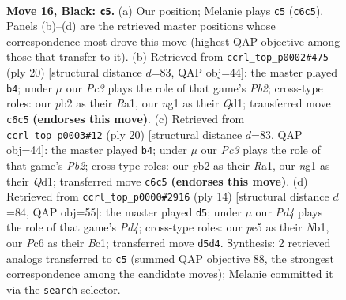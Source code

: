 \documentclass[11pt]{article}
\begin{document}
\clearpage

\begin{figure}[p]\centering
\begin{subfigure}{0.46\textwidth}\centering
\resizebox{\linewidth}{!}{%
\newchessgame
\chessboard[
  setfen={rnb1r3/p2nq1kp/1pp1p1p1/3pP3/8/2N5/PPPQ1PPP/2K1RBNR b - - 3 16},
  showmover=false,
  pgfstyle=straightmove, color=movearrow, markmove={c6-c5}
]}
\caption{}
\end{subfigure}\hfill
\begin{subfigure}{0.46\textwidth}\centering
\resizebox{\linewidth}{!}{%
\newchessgame
\chessboard[
  setfen={r3k2r/pbpnqppp/1p6/3p4/3P4/P3PN2/1P3PPP/R2QKB1R w KQkq - 1 11},
  showmover=false,
  pgfstyle=straightmove, color=movearrow, markmove={b2-b4}
]}
\caption{}
\end{subfigure}
\\[4pt]
\begin{subfigure}{0.46\textwidth}\centering
\resizebox{\linewidth}{!}{%
\newchessgame
\chessboard[
  setfen={r3k2r/pbpnqppp/1p6/3p4/3P4/P3PN2/1P3PPP/R2QKB1R w KQkq - 1 11},
  showmover=false,
  pgfstyle=straightmove, color=movearrow, markmove={b2-b4}
]}
\caption{}
\end{subfigure}\hfill
\begin{subfigure}{0.46\textwidth}\centering
\resizebox{\linewidth}{!}{%
\newchessgame
\chessboard[
  setfen={rnbqk2r/pp2ppbp/1n4p1/2p5/3PP3/6P1/PP2NPBP/RNBQK2R w KQkq - 0 8},
  showmover=false,
  pgfstyle=straightmove, color=movearrow, markmove={d4-d5}
]}
\caption{}
\end{subfigure}
\caption{\textbf{Move 16, Black: \texttt{c5}.} (a) Our position; Melanie plays \texttt{c5} (\texttt{c6c5}). Panels (b)--(d) are the retrieved master positions whose correspondence most drove this move (highest QAP objective among those that transfer to it). (b) Retrieved from \texttt{ccrl\_top\_p0002\#475} (ply 20) [structural distance $d$=83, QAP obj=44]: the master played \texttt{b4}; under $\mu$ our \emph{Pc3} plays the role of that game's \emph{Pb2}; cross-type roles: our \emph{p}b2 as their \emph{R}a1, our \emph{n}g1 as their \emph{Q}d1; transferred move \texttt{c6c5} \textbf{(endorses this move)}. (c) Retrieved from \texttt{ccrl\_top\_p0003\#12} (ply 20) [structural distance $d$=83, QAP obj=44]: the master played \texttt{b4}; under $\mu$ our \emph{Pc3} plays the role of that game's \emph{Pb2}; cross-type roles: our \emph{p}b2 as their \emph{R}a1, our \emph{n}g1 as their \emph{Q}d1; transferred move \texttt{c6c5} \textbf{(endorses this move)}. (d) Retrieved from \texttt{ccrl\_top\_p0000\#2916} (ply 14) [structural distance $d$=84, QAP obj=55]: the master played \texttt{d5}; under $\mu$ our \emph{Pd4} plays the role of that game's \emph{Pd4}; cross-type roles: our \emph{p}e5 as their \emph{N}b1, our \emph{P}c6 as their \emph{B}c1; transferred move \texttt{d5d4}. Synthesis: 2 retrieved analogs transferred to \texttt{c5} (summed QAP objective 88, the strongest correspondence among the candidate moves); Melanie committed it via the \texttt{search} selector.}
\label{fig:thought-m31}
\end{figure}
\end{document}
